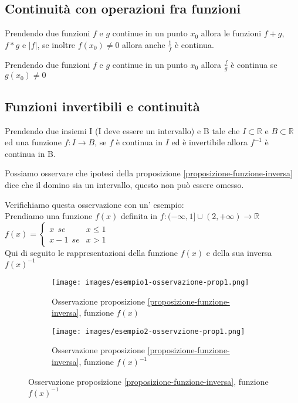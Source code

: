 \subsection{Continuità con operazioni fra funzioni}
\begin{theorem}
    Prendendo due funzioni $f$ e $g$ continue in un punto $x_0$ allora le funzioni $f + g$, $f * g$ e $|f|$, se inoltre $f(x_0) \neq 0$ allora anche $\frac{1}{f}$ è continua.
    \begin{corollaries}
        Prendendo due funzioni $f$ e $g$ continue in un punto $x_0$ allora $\frac{f}{g}$ è continua se $g(x_0) \neq 0$
    \end{corollaries}
\end{theorem}

\subsection{Funzioni invertibili e continuità}
\begin{proposition}\label{proposizione-funzione-inversa}
    Prendendo due insiemi I (I deve essere un intervallo) e B tale che $I \subset \mathbb{R}$ e $B \subset \mathbb{R}$ ed una funzione $f: I \longrightarrow B$, se $f$ è continua in $I$ ed è invertibile allora $f^{-1}$ è continua in B.
\end{proposition}
\begin{observation}
    Possiamo osservare che ipotesi della proposizione \ref{proposizione-funzione-inversa} dice che il domino sia un intervallo, questo non può essere omesso. 
\end{observation}
\begin{example}
    Verifichiamo questa osservazione con un' esempio:\\
    Prendiamo una funzione $f(x)$ definita in $f: (-\infty, 1] \cup (2, +\infty) \longrightarrow \mathbb{R}$ \: \: \: $f(x) = 
    \begin{cases}
        x \: \: se & x \leq 1 \\
        x - 1 \: \: se & x > 1
    \end{cases}
    $\\
    Qui di seguito le rappresentazioni della funzione $f(x)$ e della sua inversa $f(x)^{-1}$
\end{example}
\begin{figure}[h!]
    \vspace{10pt}
    \begin{subfigure}{.5\textwidth}
        \centering
        \texttt{[image: images/esempio1-osservazione-prop1.png]}
        \caption{Osservazione proposizione \ref{proposizione-funzione-inversa}, funzione $f(x)$}
        \label{fig:es1-prop1}
    \end{subfigure}
    \begin{subfigure}{.5\textwidth}
        \centering
        \texttt{[image: images/esempio2-osservzione-prop1.png]}
        \caption{Osservazione proposizione \ref{proposizione-funzione-inversa}, funzione $f(x)^{-1}$}
        \label{fig:es2-prop1}
    \end{subfigure}
\end{figure}
